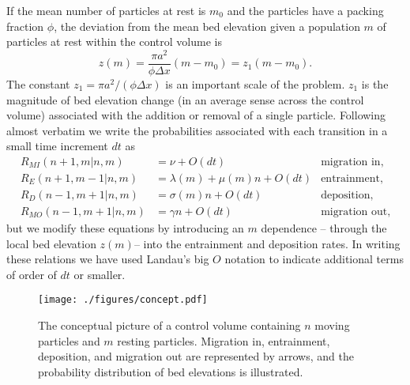 \documentclass[draft]{agujournal2018}
\newcommand\be{\begin{equation}} %
\newcommand\ee{\end{equation}}   %
\begin{document}
If the mean number of particles at rest is $m_0$ and the particles have a packing fraction $\phi$, the deviation from the mean bed elevation given a population $m$ of particles at rest within the control volume is
\be z(m) = \frac{\pi a^2}{\phi \Delta x}(m-m_0) = z_1(m-m_0). \label{eq:ele}\ee
The constant $z_1 = \pi a^2/(\phi\Delta x)$ is an important scale of the problem. 
$z_1$ is the magnitude of bed elevation change (in an average sense across the control volume) associated with the addition or removal of a single particle. 
Following \citet{Ancey2008} almost verbatim we write the probabilities associated with each transition in a small time increment $dt$ as 
\begin{align}
 R_{MI}(n+1,m| n, m) &= \nu + O(dt) & \text{migration in},\\
 R_E(n+1,m-1| n,m)  &= \lambda(m) + \mu(m) n + O(dt) & \text{entrainment},  \\
 R_D(n-1,m+1|n,m) &= \sigma(m) n + O(dt) & \text{deposition},\\
 R_{MO}(n-1,m+1|n,m) &= \gamma n + O(dt) & \text{migration out},
\end{align}
but we modify these equations by introducing an $m$ dependence -- through the local bed elevation $z(m)$-- into the entrainment and deposition rates. 
In writing these relations we have used Landau's big $O$ notation to indicate additional terms of order of $dt$ or smaller.

\begin{figure}
  \texttt{[image: ./figures/concept.pdf]}
  \caption{The conceptual picture of a control volume containing $n$ moving particles and $m$ resting particles. Migration in, entrainment, deposition, and migration out are represented by arrows, and the probability distribution of bed elevations is illustrated.}
  \label{fig:concept}
\vspace{-1.0cm}
\end{figure}
\end{document}
